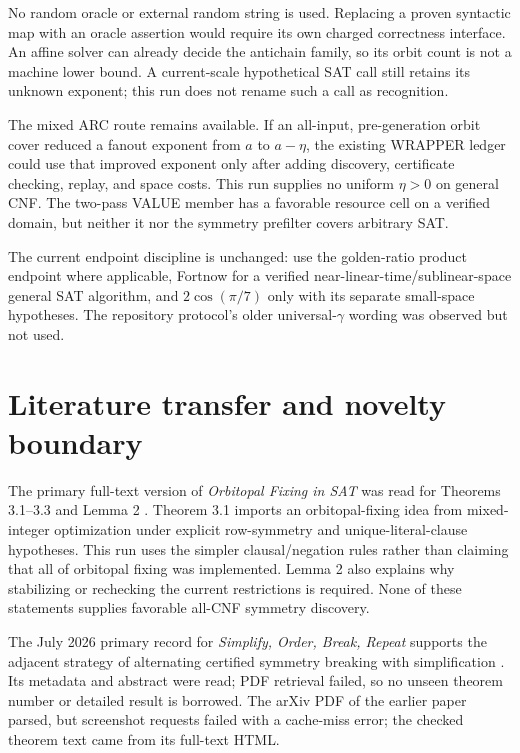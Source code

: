 \documentclass[11pt]{article}
\begin{document}
No random oracle or external random string is used. Replacing a proven syntactic map with an oracle assertion would require its own charged correctness interface. An affine solver can already decide the antichain family, so its orbit count is not a machine lower bound. A current-scale hypothetical SAT call still retains its unknown exponent; this run does not rename such a call as recognition.

The mixed ARC route remains available. If an all-input, pre-generation orbit cover reduced a fanout exponent from $a$ to $a-\eta$, the existing WRAPPER ledger could use that improved exponent only after adding discovery, certificate checking, replay, and space costs. This run supplies no uniform $\eta>0$ on general CNF. The two-pass VALUE member has a favorable resource cell on a verified domain, but neither it nor the symmetry prefilter covers arbitrary SAT.

The current endpoint discipline is unchanged: use the golden-ratio product endpoint where applicable, Fortnow for a verified near-linear-time/sublinear-space general SAT algorithm, and $2\cos(\pi/7)$ only with its separate small-space hypotheses. The repository protocol's older universal-$\gamma$ wording was observed but not used.

\section{Literature transfer and novelty boundary}
The primary full-text version of \emph{Orbitopal Fixing in SAT} was read for Theorems 3.1--3.3 and Lemma 2 \cite{arc0005Orbitopal}. Theorem 3.1 imports an orbitopal-fixing idea from mixed-integer optimization under explicit row-symmetry and unique-literal-clause hypotheses. This run uses the simpler clausal/negation rules rather than claiming that all of orbitopal fixing was implemented. Lemma 2 also explains why stabilizing or rechecking the current restrictions is required. None of these statements supplies favorable all-CNF symmetry discovery.

The July 2026 primary record for \emph{Simplify, Order, Break, Repeat} supports the adjacent strategy of alternating certified symmetry breaking with simplification \cite{arc0005SimplifyRepeat}. Its metadata and abstract were read; PDF retrieval failed, so no unseen theorem number or detailed result is borrowed. The arXiv PDF of the earlier paper parsed, but screenshot requests failed with a cache-miss error; the checked theorem text came from its full-text HTML.
\end{document}
